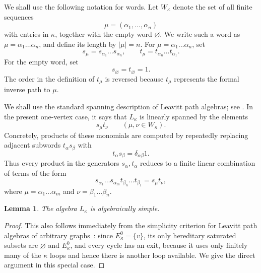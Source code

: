 \documentclass[11pt,reqno]{amsart}
\makeatletter
\theoremstyle{plain}
\newtheorem{lemma}[lemma]{Lemma}
\theoremstyle{definition}
\newcounter{problempaper}
\newenvironment{problempaperbody}{%
  \setcounter{subsection}{0}%
  \setcounter{subsubsection}{0}%
  \setcounter{paragraph}{0}%
  \renewcommand{\thesubsection}{\arabic{subsection}}%
  \renewcommand{\thesubsubsection}{\thesubsection.\arabic{subsubsection}}%
  \renewcommand{\theparagraph}{\thesubsubsection.\arabic{paragraph}}%
  \let\problem@outersection\section
  \let\problem@outersubsection\subsection
  \let\problem@outersubsubsection\subsubsection
  \let\problem@outerparagraph\paragraph
  \let\section\problem@papersection
  \let\subsection\problem@papersubsection
  \let\subsubsection\problem@papersubsubsection
}{%
  \let\section\problem@outersection
  \let\subsection\problem@outersubsection
  \let\subsubsection\problem@outersubsubsection
  \let\paragraph\problem@outerparagraph
}
\newcommand{\problem@target}[2]{%
  \hypertarget{problem-\theproblempaper-#1-#2}{}%
}
\newcommand{\problem@paperheading}[3]{%
  \par\bigskip
  \problem@target{#1}{#2}%
  \noindent{\large\bfseries #2.\quad #3\par}%
  \nobreak\smallskip
}
\newcommand{\problem@papersubheading}[3]{%
  \par\medskip
  \problem@target{#1}{#2}%
  \noindent{\normalsize\bfseries #2.\quad #3\par}%
  \nobreak\smallskip
}
\newcommand{\problem@papersubsubheading}[3]{%
  \par\smallskip
  \problem@target{#1}{#2}%
  \noindent{\normalsize\itshape #2.\quad #3.\ }%
}
\def\problem@papersection{%
  \@ifstar{\problem@papersectionstar}{\problem@papersectionnostar}%
}
\def\problem@papersectionstar#1{%
  \par\bigskip\noindent{\large\bfseries #1\par}\nobreak\smallskip
}
\def\problem@papersectionnostar#1{%
  \refstepcounter{subsection}%
  \setcounter{subsubsection}{0}%
  \setcounter{paragraph}{0}%
  \problem@paperheading{section}{\thesubsection}{#1}%
  \problem@writecontentsline{section}{\thesubsection}{#1}%
}
\def\problem@papersubsection{%
  \@ifstar{\problem@papersubsectionstar}{\problem@papersubsectionnostar}%
}
\def\problem@papersubsectionstar#1{%
  \par\medskip\noindent{\normalsize\bfseries #1\par}\nobreak\smallskip
}
\def\problem@papersubsectionnostar#1{%
  \refstepcounter{subsubsection}%
  \setcounter{paragraph}{0}%
  \problem@papersubheading{subsection}{\thesubsubsection}{#1}%
  \problem@writecontentsline{subsection}{\thesubsubsection}{#1}%
}
\def\problem@papersubsubsection{%
  \@ifstar{\problem@papersubsubsectionstar}{\problem@papersubsubsectionnostar}%
}
\def\problem@papersubsubsectionstar#1{%
  \par\smallskip\noindent{\normalsize\itshape #1.\ }%
}
\def\problem@papersubsubsectionnostar#1{%
  \refstepcounter{paragraph}%
  \problem@papersubsubheading{subsubsection}{\theparagraph}{#1}%
  \problem@writecontentsline{subsubsection}{\theparagraph}{#1}%
}
\newcommand{\problem@writecontentsline}[3]{%
  \begingroup
  \protected@write\@auxout{}{%
    \string\problemcontentsentry{\theproblempaper}{#1}{#2}{#3}{\thepage}%
  }%
  \endgroup
}
\newcommand{\problemcontentsentry}[5]{%
  \@ifundefined{problemcontents@#1}{%
    \expandafter\gdef\csname problemcontents@#1\endcsname{}%
  }{}%
  \expandafter\g@addto@macro\csname problemcontents@#1\endcsname{%
    \problemcontentsline{#1}{#2}{#3}{#4}{#5}%
  }%
}
\newcommand{\problemcontentslink}[4]{%
  \hyperlink{problem-#1-#2-#3}{#4}%
}
\newcommand{\problemcontentsline}[5]{%
  \ifstrequal{#2}{section}{%
    \par\noindent
    \problemcontentslink{#1}{#2}{#3}{\makebox[2.5em][l]{#3}#4}%
    \nobreak\dotfill
    \problemcontentslink{#1}{#2}{#3}{#5}\par
  }{%
    \ifstrequal{#2}{subsection}{%
      \par\noindent\hspace*{1.5em}%
      \problemcontentslink{#1}{#2}{#3}{\makebox[3.5em][l]{#3}#4}%
      \nobreak\dotfill
      \problemcontentslink{#1}{#2}{#3}{#5}\par
    }{%
      \par\noindent\hspace*{3em}%
      \problemcontentslink{#1}{#2}{#3}{\makebox[4.5em][l]{#3}#4}%
      \nobreak\dotfill
      \problemcontentslink{#1}{#2}{#3}{#5}\par
    }%
  }%
}
\makeatother
\begin{document}
\begin{problempaperbody}
We shall use the following notation for words. Let $W_\kappa$ denote the set of all finite sequences
\begin{equation*}
        \mu=(\alpha_1,\ldots,\alpha_n)
\end{equation*}
with entries in $\kappa$, together with the empty word $\varnothing$. We write such a word as $\mu=\alpha_1\ldots\alpha_n$, and define its length by $|\mu|=n$. For $\mu=\alpha_1\ldots\alpha_n$, set
\begin{equation*}
        s_\mu=s_{\alpha_1}\ldots s_{\alpha_n}, \qquad t_\mu=t_{\alpha_n}\ldots t_{\alpha_1}.
\end{equation*}
For the empty word, set
\begin{equation*}
        s_\varnothing=t_\varnothing=1.
\end{equation*}
The order in the definition of $t_\mu$ is reversed because $t_\mu$ represents the formal inverse path to $\mu$.

We shall use the standard spanning description of Leavitt path algebras; see \cite[Lemma 1.2.12(i),(iii)]{AbramsAraSiles2017}. In the present one-vertex case, it says that $L_\kappa$ is linearly spanned by the elements
\begin{equation*}
        s_\mu t_\nu \qquad(\mu,\nu\in W_\kappa).
\end{equation*}
Concretely, products of these monomials are computed by repeatedly replacing adjacent subwords $t_\alpha s_\beta$ with
\begin{equation*}
        t_\alpha s_\beta=\delta_{\alpha\beta}1.
\end{equation*}
Thus every product in the generators $s_\alpha,t_\alpha$ reduces to a finite linear combination of terms of the form
\begin{equation*}
        s_{\alpha_1}\ldots s_{\alpha_m}t_{\beta_n}\ldots t_{\beta_1}=s_\mu t_\nu,
\end{equation*}
where $\mu=\alpha_1\ldots\alpha_m$ and $\nu=\beta_1\ldots\beta_n$.

\begin{lemma}
\label{p2-first:lem:leavitt-simple}
The algebra $L_\kappa$ is algebraically simple.
\end{lemma}

\begin{proof}
This also follows immediately from the simplicity criterion for Leavitt path algebras of arbitrary graphs~\cite[Theorem~2.9.1]{AbramsAraSiles2017}: since $E_\kappa^0=\{v\}$, its only hereditary saturated subsets are $\varnothing$ and $E_\kappa^0$, and every cycle has an exit, because it uses only finitely many of the $\kappa$ loops and hence there is another loop available.  We give the direct argument in this special case.


\end{proof}
\end{problempaperbody}
\end{document}
